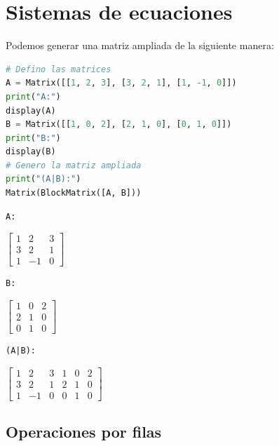 \documentclass[a4,11pt]{aleph-notas}
\begin{document}
\encabezado


\section{Sistemas de ecuaciones}

 Podemos generar una matriz ampliada de la siguiente manera:
\begin{pycodigo}
    \begin{ipynbcodigo}\begin{lstlisting}[language=Python]
# Defino las matrices
A = Matrix([[1, 2, 3], [3, 2, 1], [1, -1, 0]])
print("A:")
display(A)
B = Matrix([[1, 0, 2], [2, 1, 0], [0, 1, 0]])
print("B:")
display(B)
# Genero la matriz ampliada
print("(A|B):")
Matrix(BlockMatrix([A, B]))
    \end{lstlisting}\end{ipynbcodigo}
    \begin{ipynbsalida}
    \begin{Verbatim}
A:
    \end{Verbatim}
$\displaystyle \left[\begin{matrix}1 & 2 & 3\\3 & 2 & 1\\1 & -1 & 0\end{matrix}\right]$
    \begin{Verbatim}
B:
    \end{Verbatim}
$\displaystyle \left[\begin{matrix}1 & 0 & 2\\2 & 1 & 0\\0 & 1 & 0\end{matrix}\right]$

    \begin{Verbatim}
(A|B):
    \end{Verbatim}
$\displaystyle \left[\begin{matrix}1 & 2 & 3 & 1 & 0 & 2\\3 & 2 & 1 & 2 & 1 & 0\\1 & -1 & 0 & 0 & 1 & 0\end{matrix}\right]$
    \end{ipynbsalida}
\end{pycodigo}

\subsection{Operaciones por filas}
\end{document}
